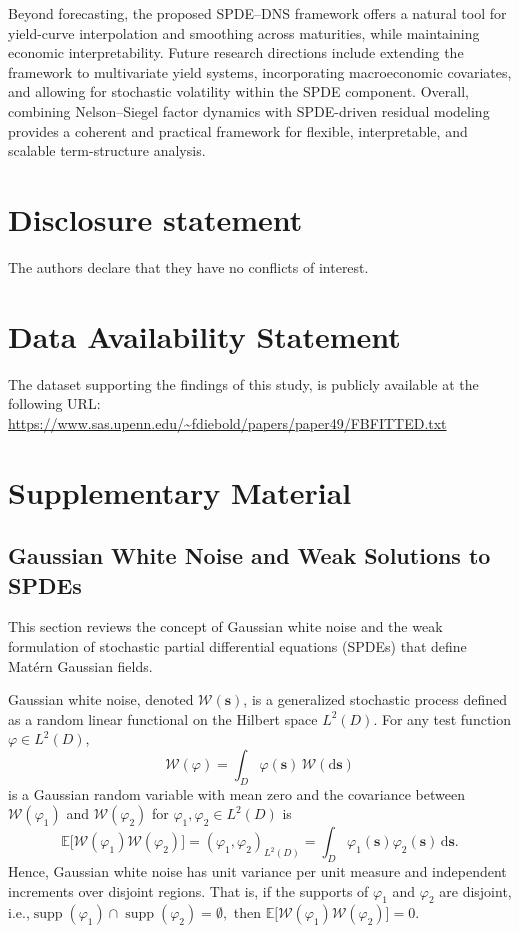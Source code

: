 \documentclass[
  12pt]{article}
\begin{document}
Beyond forecasting, the proposed SPDE–DNS framework offers a natural tool for yield-curve interpolation and smoothing across maturities, while maintaining economic interpretability. Future research directions include extending the framework to multivariate yield systems, incorporating macroeconomic covariates, and allowing for stochastic volatility within the SPDE component. Overall, combining Nelson–Siegel factor dynamics with SPDE-driven residual modeling provides a coherent and practical framework for flexible, interpretable, and scalable term-structure analysis.

\section{Disclosure statement}\label{disclosure-statement}

The authors declare that they have no conflicts of interest.

\section{Data Availability Statement}\label{data-availability-statement}

The dataset supporting the findings of this study, is publicly available at the following URL:\\
\url{https://www.sas.upenn.edu/~fdiebold/papers/paper49/FBFITTED.txt}



\renewcommand{\thesection}{A}
\section{Supplementary Material}
\subsection{Gaussian White Noise and Weak Solutions to SPDEs}\label{whitenoise}

This section reviews the concept of Gaussian white noise and the weak formulation of stochastic partial differential equations (SPDEs) that define Matérn Gaussian fields.

Gaussian white noise, denoted \( \mathcal{W}(\boldsymbol{s}) \), is a generalized stochastic process defined as a random linear functional on the Hilbert space \( L^2(D) \).
For any test function \( \varphi \in L^2(D) \),
\[
  \mathcal{W}(\varphi) = \int_D \varphi(\boldsymbol{s})\, \mathcal{W}(\mathrm{d}\boldsymbol{s})
\]
is a Gaussian random variable with mean zero and the covariance between $\mathcal{W}(\varphi_1)$ and $\mathcal{W}(\varphi_2)$ for $\varphi_1, \varphi_2 \in L^2(D)$ is 
\[
  \mathbb{E}\big[\mathcal{W}(\varphi_1)\mathcal{W}(\varphi_2)\big]
  = (\varphi_1, \varphi_2)_{L^2(D)}
  = \int_D \varphi_1(\boldsymbol{s})\varphi_2(\boldsymbol{s})\,\mathrm{d}\boldsymbol{s}.
\]
Hence, Gaussian white noise has unit variance per unit measure and independent increments over disjoint regions. That is, if the supports of $\varphi_1$ and $\varphi_2$ are disjoint, i.e.,$ \operatorname{supp}(\varphi_1) \cap \operatorname{supp}(\varphi_2) = \emptyset,$ then $\mathbb{E}\big[\mathcal{W}(\varphi_1) \mathcal{W}(\varphi_2)\big] = 0.$
\end{document}
